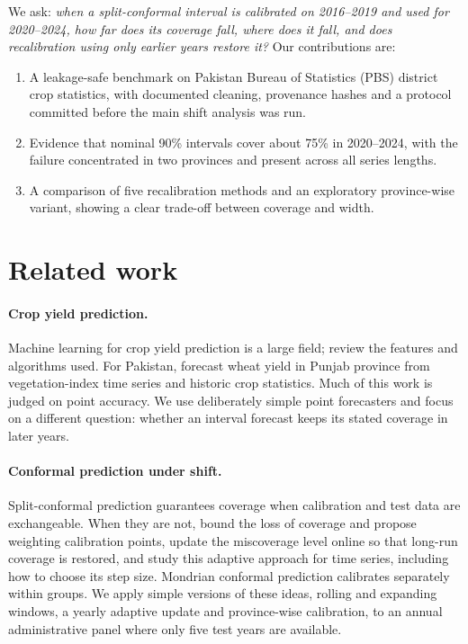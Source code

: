 \documentclass[11pt]{article}
\begin{document}
We ask: \emph{when a split-conformal interval is calibrated on 2016--2019 and used for 2020--2024, how far does its coverage fall, where does it fall, and does recalibration using only earlier years restore it?} Our contributions are:
\begin{enumerate}
  \item A leakage-safe benchmark on Pakistan Bureau of Statistics (PBS) district crop statistics, with documented cleaning, provenance hashes and a protocol committed before the main shift analysis was run.
  \item Evidence that nominal 90\% intervals cover about 75\% in 2020--2024, with the failure concentrated in two provinces and present across all series lengths.
  \item A comparison of five recalibration methods and an exploratory province-wise variant, showing a clear trade-off between coverage and width.
\end{enumerate}

\section{Related work}
\paragraph{Crop yield prediction.} Machine learning for crop yield prediction is a large field; \citet{klompenburg2020} review the features and algorithms used. For Pakistan, \citet{dempewolf2014} forecast wheat yield in Punjab province from vegetation-index time series and historic crop statistics. Much of this work is judged on point accuracy. We use deliberately simple point forecasters and focus on a different question: whether an interval forecast keeps its stated coverage in later years.

\paragraph{Conformal prediction under shift.} Split-conformal prediction \citep{vovk2005,lei2018} guarantees coverage when calibration and test data are exchangeable. When they are not, \citet{barber2023} bound the loss of coverage and propose weighting calibration points, \citet{gibbs2021} update the miscoverage level online so that long-run coverage is restored, and \citet{zaffran2022} study this adaptive approach for time series, including how to choose its step size. Mondrian conformal prediction \citep{vovk2005} calibrates separately within groups. We apply simple versions of these ideas, rolling and expanding windows, a yearly adaptive update and province-wise calibration, to an annual administrative panel where only five test years are available.
\end{document}
